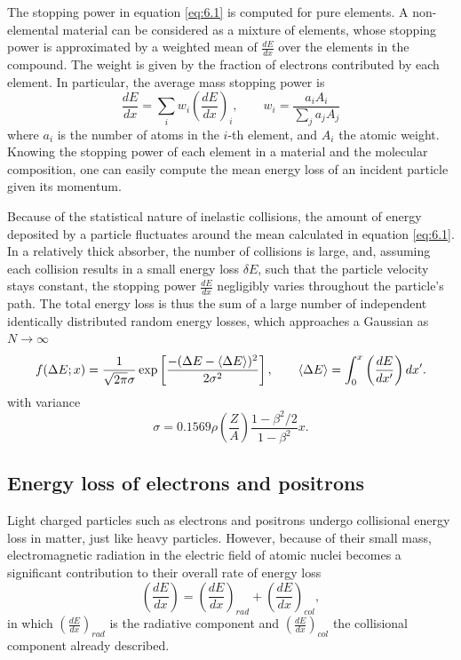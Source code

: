 The stopping power in equation \eqref{eq:6.1} is computed for pure elements. A non-elemental material can be considered as a mixture of elements, whose stopping power is approximated by a weighted mean of $\frac{dE}{dx}$ over the elements in the compound. The weight is given by the fraction of electrons contributed by each element. In particular, the average mass stopping power is
\begin{equation}
    \label{eq:6.3}
    \frac{dE}{dx} = \sum_i w_i\left( \frac{dE}{dx} \right)_i, \quad \quad w_i = \frac{a_i A_i}{\sum_j a_j A_j}
\end{equation}
where $a_i$ is the number of atoms in the $i$-th element, and $A_i$ the atomic weight. Knowing the stopping power of each element in a material and the molecular composition, one can easily compute the mean energy loss of an incident particle given its momentum. 

Because of the statistical nature of inelastic collisions, the amount of energy deposited by a particle fluctuates around the mean calculated in equation \eqref{eq:6.1}. 
In a relatively thick absorber, the number of collisions is large, and, assuming each collision results in a small energy loss $\delta E$, such that the particle velocity stays constant, the stopping power $\frac{dE}{dx}$ negligibly varies throughout the particle's path.
The total energy loss is thus the sum of a large number of independent identically distributed random energy losses, which approaches a Gaussian as $N\rightarrow \infty$
\begin{equation}
    \label{eq:6.4}
    f(\Delta E; x) = \frac{1}{\sqrt{2\pi}\sigma } \exp \left[ \frac{-(\Delta E - \expval{\Delta E})^2}{2\sigma ^2} \right], \quad\quad \expval{\Delta E} = \int_0 ^ {x} \left(\frac{dE}{dx'} \right)dx'.
\end{equation}
with variance 
\begin{equation}
    \label{eq:6.5}
    \sigma = 0.1569 \rho \left( \frac{Z}{A} \right) \frac{1-\beta^2/2}{1-\beta^2} x.
\end{equation}

\subsection{Energy loss of electrons and positrons}
\label{subsect:e-loss-electron}
Light charged particles such as electrons and positrons undergo collisional energy loss in matter, just like heavy particles. However, because of their small mass, electromagnetic radiation in the electric field of atomic nuclei becomes a significant contribution to their overall rate of energy loss
\begin{equation}
    \label{eq:6.6}
    \left ( \frac{dE}{dx} \right) = \left ( \frac{dE}{dx} \right)_{rad} + \left ( \frac{dE}{dx} \right) _{col},
\end{equation}
in which $\left ( \frac{dE}{dx} \right)_{rad}$ is the radiative component and $\left ( \frac{dE}{dx} \right) _{col}$ the collisional component already described.

